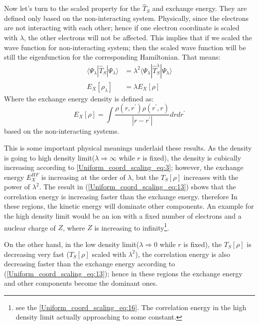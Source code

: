 Now let's turn to the scaled property for the $\hat{T}_{S}$ and exchange
energy. They are defined only based on the non-interacting system. Physically,
since the electrons are not interacting with each other; hence if one electron
coordinate is scaled with $\lambda$, the other electrons will not be affected.
This implies that if we scaled the wave function for non-interacting system;
then the scaled wave function will be still the eigenfunction for the
corresponding Hamiltonian. That means:
\begin{equation}
 \begin{split}
  \langle\Psi_{\lambda}|\hat{T}_{S}|\Psi_{\lambda}\rangle &=
\lambda^{2}\langle\Psi_{\lambda}|\hat{T}_{S}^{\lambda}|\Psi_{\lambda}\rangle \\
E_{X}[\rho_{\lambda}] &= \lambda E_{X}[\rho]
 \end{split}
\label{Uniform_coord_scaling_eq:14}
\end{equation}
Where the exchange energy density is defined as:
\begin{equation}
\label{Uniform_coord_scaling_eq:15}
E_{X}[\rho] = \int \frac{\rho(r,r^{'})\rho(r^{'},r)}{|r-r^{'}|} dr dr^{'} 
\end{equation}
based on the non-interacting systems.

This is some important physical meanings underlaid these results.  
As the density is going to high density limit($\lambda\Rightarrow\infty$
while $r$ is fixed), the density is cubically increasing according to
\ref{Uniform_coord_scaling_eq:3}; however, the exchange energy
$E_{X}^{HF}$ is increasing at the order of $\lambda$, but the $T_{S}[\rho]$ 
increases with the power of $\lambda^{2}$. The result in
(\ref{Uniform_coord_scaling_eq:13}) shows that the correlation energy is
increasing faster than the exchange energy. therefore In these regions, the
kinetic energy will dominate other components. An example for the high density
limit would be an ion with a fixed number of electrons and a nuclear charge of
$Z$, where $Z$ is increasing to infinity\footnote{see the
  \ref{Uniform_coord_scaling_eq:16}. The correlation energy in the
  high density limit actually approaching to some constant.}.
  
On the other hand, in the low density limit($\lambda\Rightarrow 0$
while $r$ is fixed), the $T_{S}[\rho]$ is decreasing very fast ($T_{S}[\rho]$
scaled with $\lambda^{2}$), the correlation energy is also decreasing faster
than the exchange energy according to (\ref{Uniform_coord_scaling_eq:13});
hence in these regions the exchange energy and other
components become the dominant ones. 

